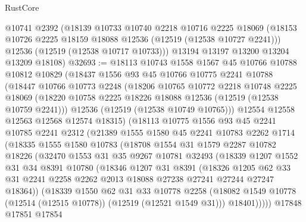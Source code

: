 \begin{lexlean}{RustCore}
\begin{coremodule}
      @10741
      @2392
      (@18139
        @10733
        @10740
        @2218
        @10716
        @2225
        @18069
        (@18153 @10726 @2225 @18159 @18088 @12536 (@12519 (@12538 @10727 @2241)))
        @12536
        (@12519 (@12538 @10717 @10733)))
      @13194
      @13197
      @13200
      @13204
      @13209
      @18108)
@32693 := @18113
    @10743
    @1558
    @1567
    @45
    @10766
    @10788
    @10812
    @10829
    (@18437
      @1556
      @93
      @45
      @10766
      @10775
      @2241
      @10788
      (@18447
        @10766
        @10773
        @2248
        (@18206
          @10765
          @10772
          @2218
          @10748
          @2225
          @18069
          (@18220 @10758 @2225 @18226 @18088 @12536 (@12519 (@12538 @10759 @2241)))
          @12536
          (@12519 (@12538 @10749 @10765)))
        @12554
        @12558
        @12563
        @12568
        @12574
        @18315)
      (@18113
        @10775
        @1556
        @93
        @45
        @2241
        @10785
        @2241
        @2312
        (@21389
          @1555
          @1580
          @45
          @2241
          @10783
          @2262
          @1714
          (@18335
            @1555
            @1580
            @10783
            (@18708
              @1554
              @31
              @1579
              @2287
              @10782
              @18226
              (@32470
                @1553
                @31
                @35
                @9267
                @10781
                @32493
                (@18339
                  @1207
                  @1552
                  @31
                  @34
                  @8391
                  @10780
                  (@18346
                    @1207
                    @31
                    @8391
                    (@18326
                      @1205
                      @62
                      @33
                      @31
                      @2241
                      @2258
                      @2262
                      @2013
                      @18088
                      @27238
                      @27241
                      @27244
                      @27247
                      @18364))
                  (@18339
                    @1550
                    @62
                    @31
                    @33
                    @10778
                    @2258
                    (@18082 @1549 @10778 (@12514 (@12515 @10778)) (@12519 (@12521 @1549 @31)))
                    @18401)))))
          @17848
          @17851
          @17854

\end{coremodule}
\end{lexlean}
